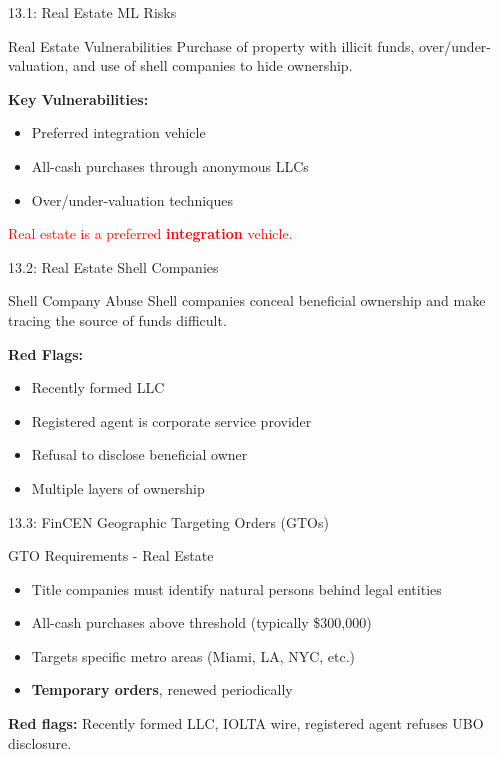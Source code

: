 \documentclass{beamer}
\begin{document}
	
	\begin{frame}{13.1: Real Estate ML Risks}
		\begin{block}{Real Estate Vulnerabilities}
			Purchase of property with illicit funds, over/under-valuation, and use of shell companies to hide ownership.
		\end{block}
		\textbf{Key Vulnerabilities:}
		\begin{itemize}
			\item Preferred integration vehicle
			\item All-cash purchases through anonymous LLCs
			\item Over/under-valuation techniques
		\end{itemize}
		\textcolor{red}{Real estate is a preferred \textbf{integration} vehicle.}
	\end{frame}
	
	\begin{frame}{13.2: Real Estate Shell Companies}
		\begin{block}{Shell Company Abuse}
			Shell companies conceal beneficial ownership and make tracing the source of funds difficult.
		\end{block}
		\textbf{Red Flags:}
		\begin{itemize}
			\item Recently formed LLC
			\item Registered agent is corporate service provider
			\item Refusal to disclose beneficial owner
			\item Multiple layers of ownership
		\end{itemize}
	\end{frame}
	
	\begin{frame}{13.3: FinCEN Geographic Targeting Orders (GTOs)}
		\begin{block}{GTO Requirements - Real Estate}
			\begin{itemize}
				\item Title companies must identify natural persons behind legal entities
				\item All-cash purchases above threshold (typically \$300,000)
				\item Targets specific metro areas (Miami, LA, NYC, etc.)
				\item \textbf{Temporary orders}, renewed periodically
			\end{itemize}
		\end{block}
		\textbf{Red flags:} Recently formed LLC, IOLTA wire, registered agent refuses UBO disclosure.
	\end{frame}
	
\end{document}
